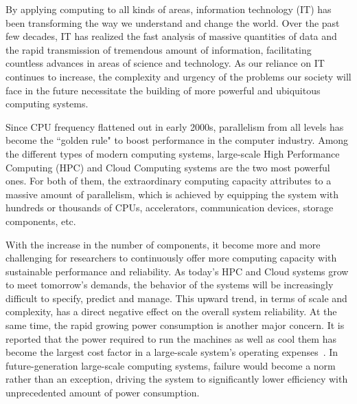 By applying computing to all kinds of areas, information technology (IT) has been transforming the way we 
understand and change the world. Over the past few decades, IT has realized the fast analysis of massive 
quantities of data and the rapid transmission of tremendous amount of information, facilitating 
countless advances in areas of science and technology. 
As our reliance on IT continues to increase, the complexity and urgency of the problems our society will face 
in the future necessitate the building of more powerful and ubiquitous computing systems. 

Since CPU frequency flattened out in early 2000s, parallelism from all levels has become the ``golden rule" to boost performance 
in the computer industry. Among the different types of modern computing systems, large-scale High Performance 
Computing (HPC) and Cloud Computing systems are the two most powerful ones. 
For both of them, the extraordinary computing capacity attributes to a massive amount of parallelism, which is achieved by 
equipping the system with hundreds or thousands of CPUs, accelerators, communication devices, storage components, etc. 


With the increase in the number of components, it become more and more challenging for 
researchers to continuously offer more computing capacity with sustainable performance and reliability. 
As today's HPC and Cloud systems grow to 
meet tomorrow's demands, the behavior of the systems will be increasingly difficult to specify, predict and manage. 
This upward trend, in terms of scale and complexity, has a direct negative effect on the overall system reliability. 
At the same time, the rapid growing power consumption is another major concern. 
It is reported that 
the power required to run the machines as well as cool them has become the largest cost factor in a large-scale system's operating 
expenses~\cite{scaramella2014worldwide}.  
In future-generation large-scale computing systems, failure would become a norm rather than an exception, 
driving the system to significantly lower efficiency with unprecedented amount of power consumption. 

